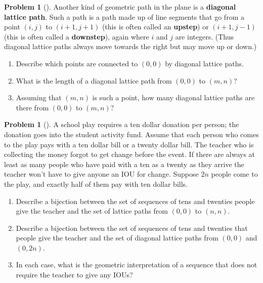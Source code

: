 \documentclass[10pt,]{book}
\newcommand{\terminology}[1]{\textbf{#1}}
\theoremstyle{plain}
\theoremstyle{definition}
\newtheorem{activity}[project]{Problem}
\theoremstyle{definition}
\numberwithin{equation}{chapter}
\begin{document}
\begin{activity}[] \label{diagonallattice}
Another kind of geometric path in the plane is a \terminology{diagonal lattice path}. Such a path is a path made up of line segments that go from a point \((i,j)\) to \((i+1,j+1)\) (this is often called an \terminology{upstep}) or \((i+1,j-1)\) (this is often called a \terminology{downstep}), again where \(i\) and \(j\) are integers. (Thus diagonal lattice paths always move towards the right but may move up or down.)%
\begin{enumerate}[font=\bfseries,label=(\alph*),ref=\alph*]
\item\label{task-50} \marginsymbol[-2.5em]{} Describe which points are connected to \((0,0)\) by diagonal lattice paths.%
\item\label{task-51} \marginsymbol[-2.5em]{} What is the length of a diagonal lattice path from \((0,0)\) to \((m,n)\)?%
\item\label{task-52} \marginsymbol[-2.5em]{} Assuming that \((m,n)\) is such a point, how many diagonal lattice paths are there from \((0,0)\) to \((m,n)\)?%
\end{enumerate}
\end{activity}
\begin{activity}[] \label{activity-50}
A school play requires a ten dollar donation per person; the donation goes into the student activity fund. Assume that each person who comes to the play pays with a ten dollar bill or a twenty dollar bill. The teacher who is collecting the money forgot to get change before the event. If there are always at least as many people who have paid with a ten as a twenty as they arrive the teacher won't have to give anyone an IOU for change. Suppose \(2n\) people come to the play, and exactly half of them pay with ten dollar bills.%
\begin{enumerate}[font=\bfseries,label=(\alph*),ref=\alph*]
\item\label{task-53} \marginsymbol[-2.5em]{} Describe a bijection between the set of sequences of tens and twenties people give the teacher and the set of lattice paths from \((0,0)\) to \((n,n)\).%
\item\label{task-54} \marginsymbol[-2.5em]{} Describe a bijection between the set of sequences of tens and twenties that people give the teacher and the set of diagonal lattice paths from \((0,0)\) and \((0,2n)\).%
\item\label{task-55} \marginsymbol[-2.5em]{} In each case, what is the geometric interpretation of a sequence that does not require the teacher to give any IOUs?%
\end{enumerate}
\end{activity}
\end{document}
